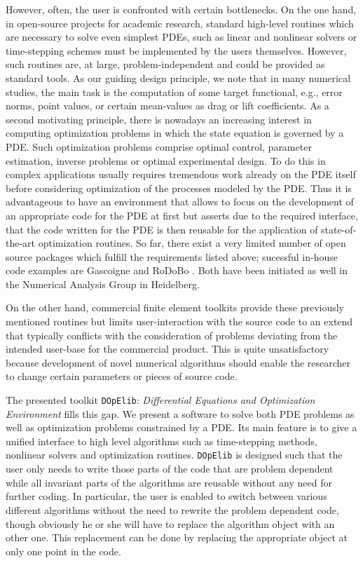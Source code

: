 \documentclass[prodmode,acmtoms]{acmsmall}
\numberwithin{equation}{section}
\newcommand{\dope}{\texttt{DOpElib}}
\begin{document}
However, often, the user is confronted with 
certain bottlenecks. On the one hand, 
in open-source projects for academic research, 
standard high-level routines 
which are necessary to solve even simplest PDEs,
such as linear and nonlinear solvers or time-stepping schemes must be implemented 
by the users themselves. However, such routines are, at large,
problem-independent and could be provided as standard tools. 
As our guiding design principle, we note that in many 
numerical studies, the main task is the computation of some  
target functional, e.g., error norms,
point values, or certain mean-values as drag or lift coefficients.
As a second motivating principle, 
there is nowadays an increasing interest in computing 
optimization problems in which the state equation is governed 
by a PDE. Such optimization problems comprise optimal control,
parameter estimation, inverse problems or optimal experimental design. 
To do this in complex applications usually requires tremendous work already
on the PDE itself before considering optimization of the processes modeled 
by the PDE. Thus it is advantageous to have an environment that allows to 
focus on the development of an appropriate code for the PDE at first but 
asserts due to the required interface, that the code written for the PDE
is then reusable for the application of state-of-the-art optimization 
routines.
So far, there exist a very limited number of open source packages
which fulfill the requirements listed above; 
sucessful in-house code examples are Gascoigne \cite{gascoigne}
and RoDoBo \cite{rodobo}. 
Both have been initiated as well in 
the Numerical Analysis Group in Heidelberg.

On the other hand, commercial finite element toolkits provide these 
previously mentioned routines but limits user-interaction
with the source code to an extend that typically conflicts
with the consideration of problems deviating from the intended 
user-base for the commercial product. 
This is quite unsatisfactory because development of novel numerical 
algorithms should enable the researcher
to change certain parameters or pieces of source code. 

The presented toolkit \dope{}: 
\textit{Differential Equations and Optimization Environment}
fills this gap. We present a software
to solve both PDE problems as well as optimization problems 
constrained by a PDE. 
Its main feature is to give a unified interface to high level algorithms such as 
time-stepping methods, nonlinear solvers and optimization routines. 
\dope{} is designed such that the user only needs to write those parts
of the code that are problem dependent while all invariant 
parts of the algorithms
are reusable without any need for further coding.
In particular, the user is enabled to switch between various different 
algorithms without the need to rewrite the problem dependent code, 
though obviously he or she will
have to replace the algorithm object with an other one. 
This replacement can be done by replacing the appropriate object at only
one point in the code.
\end{document}
